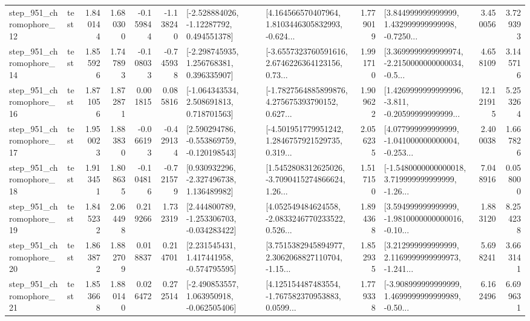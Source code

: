 \begin{tabular}{llrrrrllrlrr}
  step\_951\_chromophore\_12 &      test &      1.840144 &    1.680300 &     -0.159844 & -1.138240 &    [-2.528884026, -1.12287792, 0.494551378] &  [4.164566570407964, 1.8103446305832993, -0.624... &       1.779019 &  [3.844999999999999, 1.432999999999998, -0.7250... &            3.450056 &          3.729393 \\
  step\_951\_chromophore\_14 &      test &      1.855926 &    1.747893 &     -0.108033 & -0.745938 &    [-2.298745935, 1.256768381, 0.396335907] &  [-3.6557323760591616, 2.6746226364123156, 0.73... &       1.991710 &  [3.3699999999999974, -2.2150000000000034, -0.5... &            4.658109 &          3.145716 \\
  step\_951\_chromophore\_16 &      test &      1.871056 &    1.872871 &      0.001815 &  0.085816 &    [-1.064343534, 2.508691813, 0.718701563] &  [-1.7827564885899876, 4.275675393790152, 0.627... &       1.909622 &  [1.4269999999999996, -3.811, -0.20599999999999... &           12.121915 &          5.253264 \\
  step\_951\_chromophore\_17 &      test &      1.950023 &    1.883830 &     -0.066193 & -0.429134 &   [2.590294786, -0.553869759, -0.120198543] &  [-4.501951779951242, 1.2846757921529735, 0.319... &       2.056235 &  [4.077999999999999, -1.041000000000004, -0.253... &            2.400038 &          1.667826 \\
  step\_951\_chromophore\_18 &      test &      1.913451 &    1.808635 &     -0.104816 & -0.721579 &    [0.930932296, -2.327496738, 1.136489982] &  [1.5452808312625026, -3.7090415274866624, 1.26... &       1.517150 &  [-1.5480000000000018, 3.719999999999999, -1.26... &            7.048916 &          0.058000 \\
  step\_951\_chromophore\_19 &      test &      1.845232 &    2.064498 &      0.219266 &  1.732319 &   [2.444800789, -1.253306703, -0.034283422] &  [4.052549484624558, -2.0833246770233522, 0.526... &       1.894368 &  [3.594999999999999, -1.9810000000000016, -0.10... &            1.883120 &          8.254238 \\
  step\_951\_chromophore\_20 &      test &      1.863872 &    1.882709 &      0.018837 &  0.214701 &    [2.231545431, 1.417441958, -0.574795595] &  [3.7515382945894977, 2.3062068827110704, -1.15... &       1.852935 &  [3.212999999999999, 2.1169999999999973, -1.241... &            5.698241 &          3.663141 \\
  step\_951\_chromophore\_21 &      test &      1.853668 &    1.880140 &      0.026472 &  0.272514 &   [-2.490853557, 1.063950918, -0.062505406] &  [4.125154487483554, -1.767582370953883, 0.0599... &       1.779338 &  [-3.908999999999999, 1.4699999999999989, -0.50... &            6.162496 &          6.699631 \\

\end{tabular}
